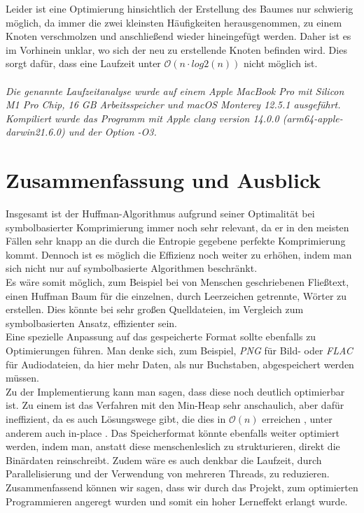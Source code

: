 \documentclass[course=erap]{aspdoc}
\begin{document}
Leider ist eine Optimierung hinsichtlich der Erstellung des Baumes nur schwierig möglich, da immer die zwei kleinsten Häufigkeiten herausgenommen, zu einem Knoten verschmolzen und anschließend wieder hineingefügt werden. Daher ist es im Vorhinein unklar, wo sich der neu zu erstellende Knoten befinden wird. Dies sorgt dafür, dass eine Laufzeit unter $\mathcal{O}(n\cdot log2(n))$ nicht möglich ist.\\\\
\textit{
Die genannte Laufzeitanalyse wurde auf einem Apple MacBook Pro mit Silicon M1 Pro Chip, 16 GB Arbeitsspeicher und macOS Monterey 12.5.1 ausgeführt. Kompiliert wurde das Programm mit Apple clang version 14.0.0 (arm64-apple-darwin21.6.0) und der Option -O3. 
}

\section{Zusammenfassung und Ausblick}

Insgesamt ist der Huffman-Algorithmus aufgrund seiner Optimalität bei symbolbasierter Komprimierung immer noch sehr relevant, da er in den meisten Fällen sehr knapp an die durch die Entropie gegebene perfekte Komprimierung kommt.
Dennoch ist es möglich die Effizienz noch weiter zu erhöhen, indem man sich nicht nur auf symbolbasierte Algorithmen beschränkt.\\
Es wäre somit möglich, zum Beispiel bei von Menschen geschriebenen Fließtext, einen Huffman Baum für die einzelnen, durch Leerzeichen getrennte, Wörter zu erstellen. Dies könnte bei sehr großen Quelldateien, im Vergleich zum symbolbasierten Ansatz, effizienter sein.\\
Eine spezielle Anpassung auf das gespeicherte Format sollte ebenfalls zu Optimierungen führen. Man denke sich, zum Beispiel, \textit{PNG} für Bild- oder \textit{FLAC} für Audiodateien, da hier mehr Daten, als nur Buchstaben, abgespeichert werden müssen.\\
Zu der Implementierung kann man sagen, dass diese noch deutlich optimierbar ist. Zu einem ist das Verfahren mit den Min-Heap sehr anschaulich, aber dafür ineffizient, da es auch Lösungswege gibt, die dies in $\mathcal{O}(n)$ erreichen \cite{Leeuwen1976OnTC}, unter anderem auch in-place \cite{10.1007/3-540-60220-8_79}.
Das Speicherformat könnte ebenfalls weiter optimiert werden, indem man, anstatt diese menschenleslich zu strukturieren, direkt die Binärdaten reinschreibt. Zudem wäre es auch denkbar die Laufzeit, durch Parallelisierung und der Verwendung von mehreren Threads, zu reduzieren.\\
Zusammenfassend können wir sagen, dass wir durch das Projekt, zum optimierten Programmieren angeregt wurden und somit ein hoher Lerneffekt erlangt wurde.


{}
\end{document}
